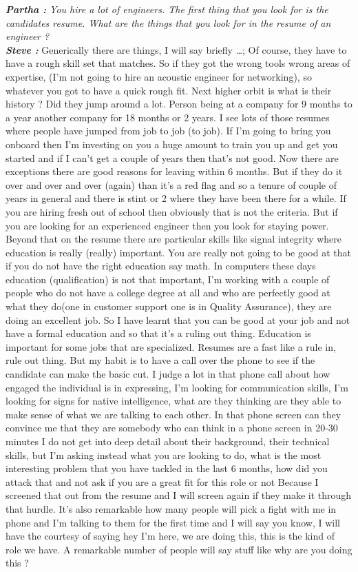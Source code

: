 \documentclass[a4paper, 12pt]{article}
\begin{document}
\begin{flushleft}
        \textit {\textbf {Partha :} You hire a lot of engineers. The first thing that you look for is the candidates resume. What are the things that you look for in the resume of an engineer ?}\\
        \textit {\textbf {Steve :}} Generically there are things, I will say briefly \ldots; Of course, they have to have a rough skill set that matches. So if they got the wrong tools wrong areas of expertise, (I'm not going to hire an acoustic engineer for networking), so whatever you got to have  a quick rough fit. Next higher orbit is what is their history ? Did they jump around a lot. Person being at a company for 9 months to a year another company for 18 months or 2 years. I see lots of those resumes where people have jumped from job to job (to job). If I'm going to bring you onboard then I'm investing on you a huge amount to train you up and get you started and if I can’t get a couple of years then that's not good. Now there are exceptions there are good reasons for leaving within 6 months. But if they do it over and over and over (again) than it's a red flag and so a tenure of couple of years in general and there is stint or 2 where they have been there for a while. If you are hiring fresh out of school then obviously that is not the criteria. But if you are looking for an experienced engineer then you look for staying power. Beyond that on the resume there are particular skills like signal integrity where education is really (really) important. You are really not going to be good at that if you do not have the right education say math. In computers these days education (qualification) is not that important, I'm working with a couple of people who do not have a college degree at all and who are perfectly good at what they do(one in customer support one is in Quality Assurance), they are doing an excellent job. So I have learnt that you can be good at your job and not have a formal education and so that it’s a ruling out thing. Education is important for some jobs that are specialized. Resumes are a fast like a  rule in, rule out thing. But my habit is to have a call over the phone to see if the candidate can make the basic cut. I judge a lot in that phone call about how engaged the individual is in expressing, I'm looking for communication skills, I'm looking for signs for native intelligence, what are they thinking are they able to make sense of what we are talking to each other. In that phone screen can they convince me that they are somebody who can think in a phone screen in 20-30 minutes I do not get into deep detail about their background, their technical skills, but I'm asking instead what you are looking to do, what is the most interesting problem that you have tackled in the last 6 months, how did you attack that and not ask if you are a great fit for this role or not Because I screened that out from the resume and I will screen again if they make it through that hurdle.  It’s also remarkable how many people will pick a fight with me in phone and I'm talking to them for the first time and I will say you know, I will have the courtesy of saying hey I'm here, we are doing this,  this is the kind of role we have. A remarkable number of people will say stuff like why are you doing this ? 
\end{flushleft}
\end{document}
